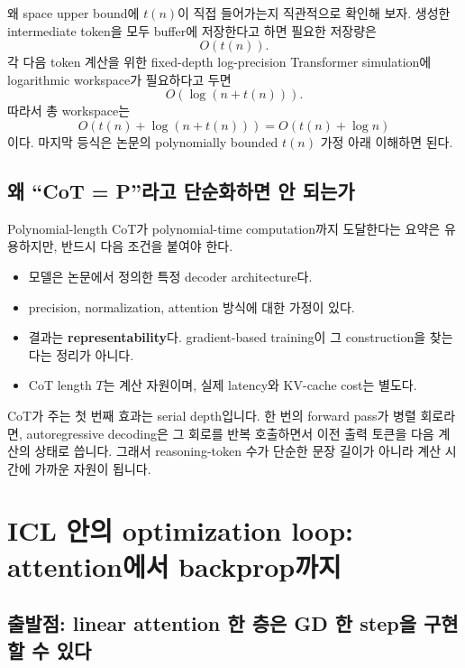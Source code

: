 \documentclass[11pt,a4paper,oneside,openany]{memoir}
\theoremstyle{definition}
\begin{document}
\begin{suppbox}
왜 space upper bound에 $t(n)$이 직접 들어가는지 직관적으로 확인해 보자.
생성한 intermediate token을 모두 buffer에 저장한다고 하면 필요한 저장량은
\[
O(t(n)).
\]
각 다음 token 계산을 위한 fixed-depth log-precision Transformer simulation에 logarithmic workspace가 필요하다고 두면
\[
O(\log(n+t(n))).
\]
따라서 총 workspace는
\[
O\!\left(t(n)+\log(n+t(n))\right)
=O\!\left(t(n)+\log n\right)
\]
이다. 마지막 등식은 논문의 polynomially bounded $t(n)$ 가정 아래 이해하면 된다.
\end{suppbox}

\section{왜 ``CoT = P''라고 단순화하면 안 되는가}

Polynomial-length CoT가 polynomial-time computation까지 도달한다는 요약은 유용하지만, 반드시 다음 조건을 붙여야 한다.

\begin{itemize}
\item 모델은 논문에서 정의한 특정 decoder architecture다.
\item precision, normalization, attention 방식에 대한 가정이 있다.
\item 결과는 \textbf{representability}다. gradient-based training이 그 construction을 찾는다는 정리가 아니다.
\item CoT length $T$는 계산 자원이며, 실제 latency와 KV-cache cost는 별도다.
\end{itemize}

\begin{presentbox}
CoT가 주는 첫 번째 효과는 serial depth입니다. 한 번의 forward pass가 병렬 회로라면, autoregressive decoding은 그 회로를 반복 호출하면서 이전 출력 토큰을 다음 계산의 상태로 씁니다. 그래서 reasoning-token 수가 단순한 문장 길이가 아니라 계산 시간에 가까운 자원이 됩니다.
\end{presentbox}

\chapter{ICL 안의 optimization loop: attention에서 backprop까지}

\section{출발점: linear attention 한 층은 GD 한 step을 구현할 수 있다}
\end{document}

